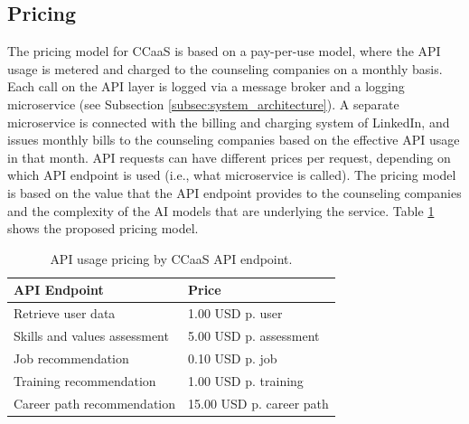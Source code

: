 \subsection{Pricing}

The pricing model for CCaaS is based on a pay-per-use model, where the API usage is metered and
charged to the counseling companies on a monthly basis. Each call on the API layer is logged via
a message broker and a logging microservice (see Subsection \ref{subsec:system_architecture}).
A separate microservice is connected with the billing and charging system of LinkedIn, and issues monthly
bills to the counseling companies based on the effective API usage in that month. API requests
can have different prices per request, depending on which API endpoint is used (i.e., what microservice
is called). The pricing model is based on the value that the API endpoint provides to the counseling
companies and the complexity of the AI models that are underlying the service. Table \ref{tab:pricing}
shows the proposed pricing model.

\begin{table}[h!]
    \centering
    \caption{API usage pricing by CCaaS API endpoint.}
    \label{tab:pricing}

    \tiny
    \renewcommand{\arraystretch}{1.1}
    \small\setlength\tabcolsep{8pt}

    \begin{tabularx}{0.6\linewidth}{X X}
        \toprule
        \textbf{API Endpoint} &
            \textbf{Price} \\
        \toprule

        Retrieve user data &
            1.00 USD p. user\\ 
        \midrule
        
        Skills and values assessment &
            5.00 USD p. assessment\\ 
        \midrule

        Job recommendation &
            0.10 USD p. job\\ 
        \midrule

        Training recommendation &
            1.00 USD p. training\\
        \midrule

        Career path recommendation &
            15.00 USD p. career path\\ 
        \bottomrule
    \end{tabularx}
\end{table}



